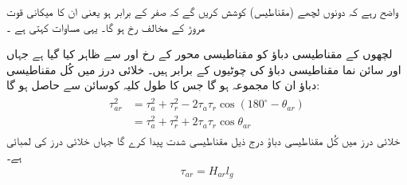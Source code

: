 واضح رہے کہ  دونوں لچھے (مقناطیس) کوشش کریں گے کہ  صفر کے برابر ہو یعنی ان کا میکانی قوت مروڑ   کے مخالف رخ ہو گا۔ یہی مساوات   کہتی  ہے ۔

لچھوں  کے مقناطیسی دباؤ کو  مقناطیسی محور کے رخ   اور  سے ظاہر کیا گیا ہے  جہاں  اور  سائن نما مقناطیسی دباؤ کی چوٹیوں کے برابر ہیں۔   خلائی درز میں کُل مقناطیسی دباؤ  ان  کا مجموعہ ہو گا جس کا طول  کلیہ کوسائن   سے حاصل ہو گا:
\begin{gather}
\begin{aligned}\label{مساوات_گھومتے_مشین_مربع_کل_دباو}
\tau_{ar}^2&=\tau_a^2+\tau_r^2-2\tau_a \tau_r \cos (180^{\circ}-\theta_{ar})\\
&=\tau_a^2+\tau_r^2+2\tau_a \tau_r \cos \theta_{ar}
\end{aligned}
\end{gather}
خلائی درز میں کُل مقناطیسی دباؤ  درج ذیل مقناطیسی شدت  پیدا کرے گا جہاں  خلائی درز کی لمبائی ہے۔
\begin{align}
\tau_{ar}=H_{ar} l_g
\end{align}

